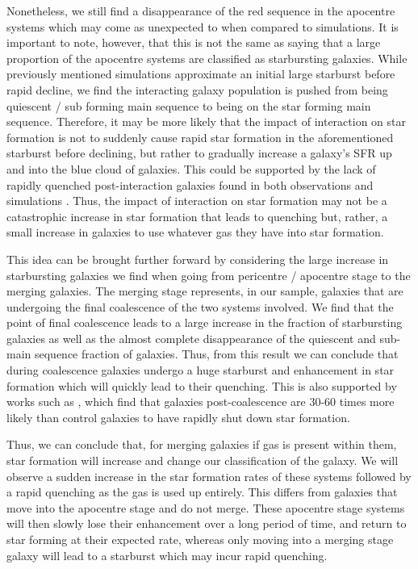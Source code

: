 Nonetheless, we still find a disappearance of the red sequence in the apocentre systems which may come as unexpected to when compared to simulations. It is important to note, however, that this is not the same as saying that a large proportion of the apocentre systems are classified as starbursting galaxies. While previously mentioned simulations approximate an initial large starburst before rapid decline, we find the interacting galaxy population is pushed from being quiescent / sub forming main sequence to being on the star forming main sequence. Therefore, it may be more likely that the impact of interaction on star formation is not to suddenly cause rapid star formation in the aforementioned starburst before declining, but rather to gradually increase a galaxy's SFR up and into the blue cloud of galaxies. This could be supported by the lack of rapidly quenched post-interaction galaxies found in both observations \citep{2017ApJ...845..145W} and simulations \citep{2020MNRAS.493.3716H, 2021MNRAS.504.1888Q}. Thus, the impact of interaction on star formation may not be a catastrophic increase in star formation that leads to quenching but, rather, a small increase in galaxies to use whatever gas they have into star formation. %

This idea can be brought further forward by considering the large increase in starbursting galaxies we find when going from pericentre / apocentre stage to the merging galaxies. The merging stage represents, in our sample, galaxies that are undergoing the final coalescence of the two systems involved. We find that the point of final coalescence leads to a large increase in the fraction of starbursting galaxies as well as the almost complete disappearance of the quiescent and sub-main sequence fraction of galaxies. Thus, from this result we can conclude that during coalescence galaxies undergo a huge starburst and enhancement in star formation which will quickly lead to their quenching. This is also supported by works such as \citet{2022MNRAS.517L..92E}, which find that galaxies post-coalescence are 30-60 times more likely than control galaxies to have rapidly shut down star formation.

Thus, we can conclude that, for merging galaxies if gas is present within them, star formation will increase and change our classification of the galaxy. We will observe a sudden increase in the star formation rates of these systems followed by a rapid quenching as the gas is used up entirely. This differs from galaxies that move into the apocentre stage and do not merge. These apocentre stage systems will then slowly lose their enhancement over a long period of time, and return to star forming at their expected rate, whereas only moving into a merging stage galaxy will lead to a starburst which may incur rapid quenching.

